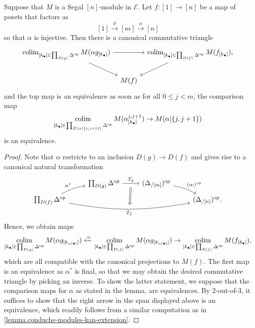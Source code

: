 \documentclass[a4paper, 11pt]{amsart}
\numberwithin{theorem}{section}
\theoremstyle{definition}
\newcommand{\op}{\mathrm{op}}
\def\colim{\qopname\relax m{colim}}
\newcommand{\E}{\mathscr{E}}
\begin{document}
\begin{lemma}\label{lemma.conduche-modules-induction}
	Suppose that $M$ is a Segal $[n]$-module in $\E$. 
	Let $f : [1] \rightarrow [n]$ be a map of posets that  
	 factors as $$[1] \xrightarrow{g} [m] \xrightarrow{\alpha} [n]$$ so that $\alpha$ is injective.
	Then there is a canonical commutative triangle 
	\[
		\begin{tikzcd}[column sep = tiny]
			\colim_{[k_\bullet] \in \prod_{D(g)}\Delta^\op} M(\alpha g_{[k_\bullet]})\arrow[dr] \arrow[rr] && \colim_{[k_\bullet] \in \prod_{D(f)}\Delta^\op} M(f_{[k_\bullet]}),\arrow[dl] \\
			& M(f)
		\end{tikzcd}
	\]
	and the top map is an equivalence as soon as 
	 for all $0 \leq j < m$, the comparison map 
	$$
	\colim_{[k_\bullet] \in \prod_{D(\alpha|\{j,j+1\})}\Delta^\op} M(\alpha^{j,j+1}_{[k_\bullet]}) \rightarrow M(\alpha|\{j,j+1\}) 
	$$
	is an equivalence.
\end{lemma}
\begin{proof}
	Note that $\alpha$ restricts to an inclusion $D(g) \rightarrow D(f)$ and gives rise to a canonical 
	natural transformation 
	\[
		\begin{tikzcd}[row sep = tiny]
			&  \prod_{D(g)} \Delta^\op\arrow[r, "T_g"name=f]  & (\Delta_{/[m]})^\op \arrow[dr, "(\alpha_!)^\op", bend left = 10pt] \\
			\prod_{D(f)} \Delta^\op\arrow[ur, "\alpha^*", bend left = 10pt] \arrow[rrr, "T_f"'name=t, bend right = 10pt] &&& (\Delta_{/[n]})^\op.
			\arrow[from=f,to=t, Rightarrow, shorten >= 6pt, shorten <= 6pt]
		\end{tikzcd}
	\]
	Hence, we obtain maps
	$$
	\colim_{[k_\bullet] \in \prod_{D(g)}\Delta^\op} M(\alpha g_{[k_{\alpha(\bullet)}]}) \xleftarrow{\simeq} \colim_{[k_\bullet] \in \prod_{D(f)}\Delta^\op} M(\alpha g_{[k_{\alpha(\bullet)}]}) \rightarrow \colim_{[k_\bullet] \in \prod_{D(f)}\Delta^\op} M(f_{[k_\bullet]}) ,
	$$
	which are all compatible with the canonical projections to $M(f)$. 
	The first map is an equivalence as $\alpha^*$ is final, 
	so that we may obtain the desired commutative triangle by picking an inverse. 
	To show the latter statement, we 
	suppose that the comparison maps for $\alpha$ as stated in the lemma, 
	are equivalences. By 2-out-of-3, it suffices to show that the right arrow in the span displayed above is an equivalence, 
	which readily follows from a similar computation as in \cref{lemma.conduche-modules-kan-extension}.
\end{proof}
\end{document}

